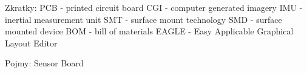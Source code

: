 Zkratky:
PCB - printed circuit board
CGI - computer generated imagery
IMU - inertial measurement unit
SMT - surface mount technology
SMD - surface mounted device
BOM - bill of materials
EAGLE - Easy Applicable Graphical Layout Editor

Pojmy:
Sensor Board